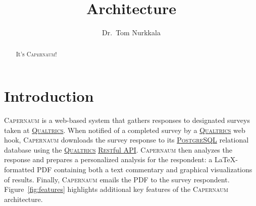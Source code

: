 \documentclass{article}
\title{\caper{} Architecture}
\author{Dr.\ Tom Nurkkala}
\newcommand{\caper}{\textsc{Capernaum}}
\newcommand{\rest}{\textsc{Rest}ful}
\newcommand{\pg}{\href{https://www.postgresql.org/}{\textsc{PostgreSQL}}}
\newcommand{\qual}{\href{https://www.qualtrics.com/}{\textsc{Qualtrics}}}
\begin{document}
\maketitle

\begin{abstract}
  It's \caper!
\end{abstract}

\tableofcontents

\section{Introduction}
\label{sec:introduction}

\caper{} is a web-based system
that gathers responses to designated surveys taken at {\qual}.
When notified of a completed survey by a \qual{} web hook,
\caper{}
downloads the survey response
to its \pg{} relational database
using the
\qual{} \href{https://api.qualtrics.com/}{\rest{} API}.
\caper{} then
analyzes the response and
prepares a personalized analysis for the respondent:
a \LaTeX-formatted PDF containing both a text commentary
and graphical visualizations of results.
Finally, \caper{}
emails the PDF to the survey respondent.
Figure~\ref{fig:features} highlights additional
key features of the \caper{} architecture.
\end{document}
